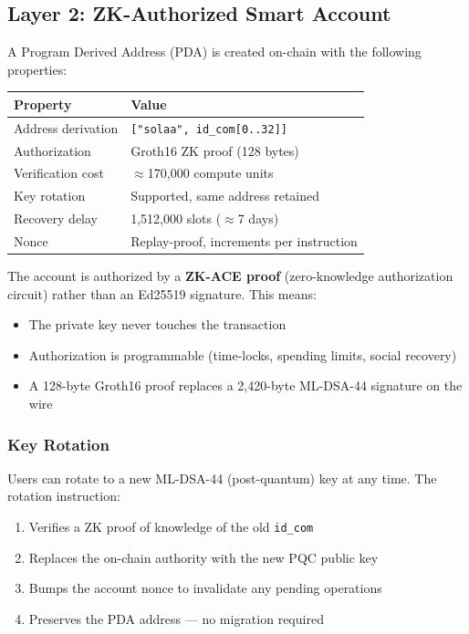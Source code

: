\documentclass[11pt, a4paper]{article}
\begin{document}
\subsection{Layer 2: ZK-Authorized Smart Account}

A Program Derived Address (PDA) is created on-chain with the following properties:

\begin{center}
\begin{tabular}{ll}
  \toprule
  \textbf{Property} & \textbf{Value} \\
  \midrule
  Address derivation & \texttt{["solaa", id\_com[0..32]]} \\
  Authorization & Groth16 ZK proof (128 bytes) \\
  Verification cost & $\approx$170,000 compute units \\
  Key rotation & Supported, same address retained \\
  Recovery delay & 1,512,000 slots ($\approx$7 days) \\
  Nonce & Replay-proof, increments per instruction \\
  \bottomrule
\end{tabular}
\end{center}

\vspace{0.5em}
The account is authorized by a \textbf{ZK-ACE proof} (zero-knowledge authorization circuit)
rather than an Ed25519 signature. This means:

\begin{itemize}
  \item The private key never touches the transaction
  \item Authorization is programmable (time-locks, spending limits, social recovery)
  \item A 128-byte Groth16 proof replaces a 2,420-byte ML-DSA-44 signature on the wire
\end{itemize}

\subsubsection{Key Rotation}

Users can rotate to a new ML-DSA-44 (post-quantum) key at any time. The rotation instruction:

\begin{enumerate}
  \item Verifies a ZK proof of knowledge of the old \texttt{id\_com}
  \item Replaces the on-chain authority with the new PQC public key
  \item Bumps the account nonce to invalidate any pending operations
  \item Preserves the PDA address --- no migration required
\end{enumerate}
\end{document}
